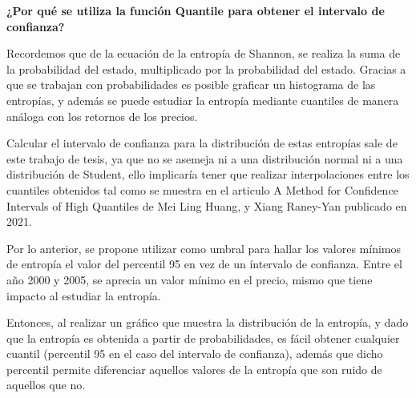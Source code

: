\textbf{¿Por qué se utiliza la función Quantile para obtener el intervalo de confianza?}



Recordemos que de la ecuación de la entropía de Shannon, se realiza la suma de la probabilidad del estado, multiplicado por la probabilidad del estado. Gracias a que se trabajan con probabilidades es posible graficar un histograma de las entropías, y además se puede estudiar la entropía mediante cuantiles de manera análoga con los retornos de los precios.

Calcular el intervalo de confianza para la distribución de estas entropías sale de este trabajo de tesis, ya que no se asemeja ni a una distribución normal ni a una distribución de Student, ello implicaría tener que realizar interpolaciones entre los cuantiles obtenidos tal como se muestra en el articulo A Method for Confidence Intervals of High Quantiles de Mei Ling Huang, y Xiang Raney-Yan publicado en 2021. 

Por lo anterior, se propone utilizar como umbral para hallar los valores mínimos de entropía el valor del percentil 95 en vez de un íntervalo de confianza. Entre el año 2000 y 2005, se aprecia un valor mínimo en el precio, mismo que tiene impacto al estudiar la entropía.


Entonces, al realizar un gráfico que muestra la distribución de la entropía, y dado que la entropía es obtenida a partir de probabilidades, es fácil obtener cualquier cuantil (percentil 95 en el caso del intervalo de confianza), además que dicho percentil permite diferenciar aquellos valores de la entropía que son ruido de aquellos que no. 

